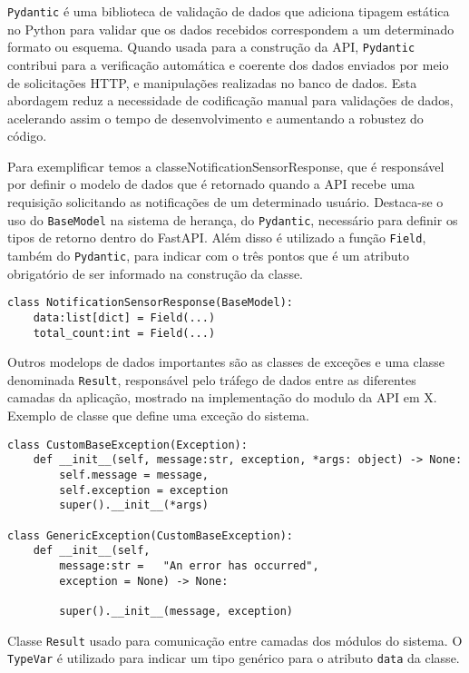 \texttt{Pydantic} é uma biblioteca de validação de dados que adiciona tipagem estática no Python para validar que os dados recebidos correspondem a um determinado formato ou esquema. Quando usada para a construção da \gls{API}, \texttt{Pydantic} contribui para a verificação automática e coerente dos dados enviados por meio de solicitações \gls{HTTP}, e manipulações realizadas no banco de dados. Esta abordagem reduz a necessidade de codificação manual para validações de dados, acelerando assim o tempo de desenvolvimento e aumentando a robustez do código.

Para exemplificar temos a  classeNotificationSensorResponse, que é responsável por definir o modelo de dados que é retornado quando a \gls{API} recebe uma requisição solicitando as notificações de um determinado usuário. Destaca-se o uso do \texttt{BaseModel} na sistema de herança, do \texttt{Pydantic}, necessário para definir os tipos de retorno dentro do FastAPI. Além disso é utilizado a função \texttt{Field}, também do \texttt{Pydantic}, para indicar com o três pontos que é um atributo obrigatório de ser informado na construção da classe.

\begin{verbatim}
class NotificationSensorResponse(BaseModel):
    data:list[dict] = Field(...)
    total_count:int = Field(...)
\end{verbatim}

Outros modelops de dados importantes são as classes de exceções e uma classe denominada \texttt{Result}, responsável pelo tráfego de dados entre as diferentes camadas da aplicação, mostrado na implementação do modulo da \gls{API} em X.%
Exemplo de classe que define uma exceção do sistema.
\begin{verbatim}
class CustomBaseException(Exception):
    def __init__(self, message:str, exception, *args: object) -> None:
        self.message = message,
        self.exception = exception
        super().__init__(*args)

class GenericException(CustomBaseException):
    def __init__(self,
        message:str =   "An error has occurred",
        exception = None) -> None:

        super().__init__(message, exception)
\end{verbatim}


Classe \texttt{Result} usado para comunicação entre camadas dos módulos do sistema. O \texttt{TypeVar} é utilizado para indicar um tipo genérico para o atributo \texttt{data} da classe.

